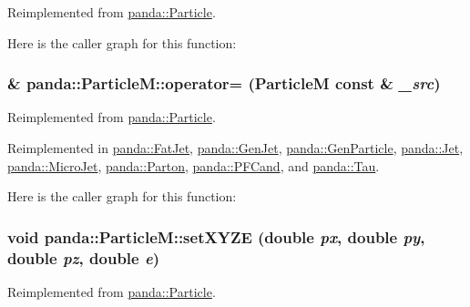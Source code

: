 Reimplemented from \hyperlink{classpanda_1_1Particle_aa793c05fc1334ed462e18c794339eebf}{panda::Particle}.

Here is the caller graph for this function:\hypertarget{classpanda_1_1ParticleM_a37f7be4e1150b6080b47b005af730af5}{
\subsubsection[{operator=}]{ \& panda::ParticleM::operator= ({\bf ParticleM} const \& {\em \_\-src})}}
\label{classpanda_1_1ParticleM_a37f7be4e1150b6080b47b005af730af5}


Reimplemented from \hyperlink{classpanda_1_1Particle_a8c4fabfceb39b746b0e68a7389e662c4}{panda::Particle}.

Reimplemented in \hyperlink{classpanda_1_1FatJet_a20e4f6ca23c2a9a603c33e7f023337fe}{panda::FatJet}, \hyperlink{classpanda_1_1GenJet_aeaa1c9ce79a2ac5e7d49ff5ea1e34136}{panda::GenJet}, \hyperlink{classpanda_1_1GenParticle_a46eed568bb72468ccda95c09002ea6a5}{panda::GenParticle}, \hyperlink{classpanda_1_1Jet_a06509e069beffe7d5fa12a5450254e6a}{panda::Jet}, \hyperlink{classpanda_1_1MicroJet_a9375dd6d13362ae323e9915b529458e8}{panda::MicroJet}, \hyperlink{classpanda_1_1Parton_a0def202110cf69ff7d9213cbf9db02ec}{panda::Parton}, \hyperlink{classpanda_1_1PFCand_ad32d7ae95ef68eb076604648684aca06}{panda::PFCand}, and \hyperlink{classpanda_1_1Tau_a1482f04be4fffde6b5c648ae3e7b539f}{panda::Tau}.

Here is the caller graph for this function:\hypertarget{classpanda_1_1ParticleM_a725a5be9c884b3819322f1cfd6b83010}{
\subsubsection[{setXYZE}]{\setlength{\rightskip}{0pt plus 5cm}void panda::ParticleM::setXYZE (double {\em px}, \/  double {\em py}, \/  double {\em pz}, \/  double {\em e})}}
\label{classpanda_1_1ParticleM_a725a5be9c884b3819322f1cfd6b83010}


Reimplemented from \hyperlink{classpanda_1_1Particle_adc7a78ac2476aac1648ae81f70e17211}{panda::Particle}.

